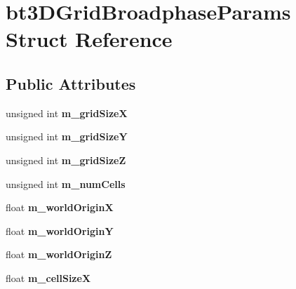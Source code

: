\hypertarget{structbt3DGridBroadphaseParams}{}\section{bt3\+D\+Grid\+Broadphase\+Params Struct Reference}
\label{structbt3DGridBroadphaseParams}
\subsection*{Public Attributes}
\begin{DoxyCompactItemize}
\item 
\mbox{\label{structbt3DGridBroadphaseParams_adc70856967bc62230361ec28180f5345}} 
unsigned int {\bfseries m\+\_\+grid\+SizeX}
\item 
\mbox{\label{structbt3DGridBroadphaseParams_a3619326f3b95566d301011f675434420}} 
unsigned int {\bfseries m\+\_\+grid\+SizeY}
\item 
\mbox{\label{structbt3DGridBroadphaseParams_a13cdda55d295d2f5b7eb5c74660dde14}} 
unsigned int {\bfseries m\+\_\+grid\+SizeZ}
\item 
\mbox{\label{structbt3DGridBroadphaseParams_a270650daad5611c2c189b0b68d5fb292}} 
unsigned int {\bfseries m\+\_\+num\+Cells}
\item 
\mbox{\label{structbt3DGridBroadphaseParams_a2048508f20202b758c627807dfc9434d}} 
float {\bfseries m\+\_\+world\+OriginX}
\item 
\mbox{\label{structbt3DGridBroadphaseParams_a7d58885fa7a4991ed1263f81e855aecd}} 
float {\bfseries m\+\_\+world\+OriginY}
\item 
\mbox{\label{structbt3DGridBroadphaseParams_a0491c5a9c15cfa8a80bf92c353fa718c}} 
float {\bfseries m\+\_\+world\+OriginZ}
\item 
\mbox{\label{structbt3DGridBroadphaseParams_a0603555c0d6b26346bb0e371ecce3b93}} 
float {\bfseries m\+\_\+cell\+SizeX}

\end{DoxyCompactItemize}
